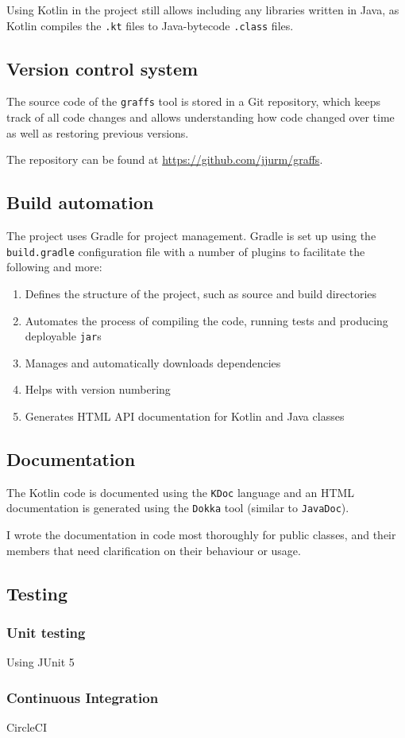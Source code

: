 Using Kotlin in the project still allows including any libraries written in Java, as Kotlin compiles the \texttt{.kt} files to Java-bytecode \texttt{.class} files.

\subsection{Version control system}

The source code of the \texttt{graffs} tool is stored in a Git repository, which keeps track of all code changes and allows understanding how code changed over time as well as restoring previous versions.

The repository can be found at \url{https://github.com/jjurm/graffs}.

\subsection{Build automation}

The project uses Gradle for project management.
Gradle is set up using the \texttt{build.gradle} configuration file with a number of plugins to facilitate the following and more:
\begin{enumerate}
    \item Defines the structure of the project, such as source and build directories
    \item Automates the process of compiling the code, running tests and producing deployable \texttt{jar}s
    \item Manages and automatically downloads dependencies
    \item Helps with version numbering
    \item Generates HTML API documentation for Kotlin and Java classes
\end{enumerate}

\subsection{Documentation}

The Kotlin code is documented using the \texttt{KDoc} language and an HTML documentation is generated using the \texttt{Dokka} tool (similar to \texttt{JavaDoc}).

I wrote the documentation in code most thoroughly for public classes, and their members that need clarification on their behaviour or usage.

\subsection{Testing}

\subsubsection{Unit testing}
Using JUnit 5

\subsubsection{Continuous Integration}
CircleCI

